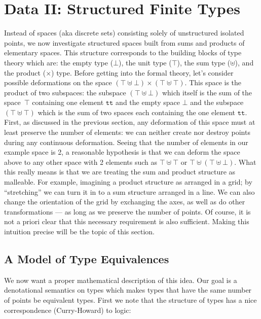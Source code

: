 \documentclass{article}
\begin{document}
\section{Data II: Structured Finite Types}
\label{sec:pi1}

Instead of spaces (aka discrete sets) consisting solely of
unstructured isolated points, we now investigate structured spaces
built from sums and products of elementary spaces. This structure
corresponds to the building blocks of type theory which are: the empty
type ($\bot$), the unit type ($\top$), the sum type ($\uplus$), and
the product ($\times$) type. Before getting into the formal theory,
let's consider possible deformations on the space $(\top \uplus \bot)
\times (\top \uplus \top)$. This space is the product of two
subspaces: the subspace $(\top \uplus \bot)$ which itself is the sum
of the space~$\top$ containing one element $\texttt{tt}$ and the empty
space $\bot$ and the subspace $(\top \uplus \top)$ which is the sum of
two spaces each containing the one element $\texttt{tt}$. First, as
discussed in the previous section, any deformation of this space must
at least preserve the number of elements: we can neither create nor
destroy points during any continuous deformation. Seeing that the
number of elements in our example space is 2, a reasonable hypothesis
is that we can deform the space above to any other space with 2
elements such as $\top \uplus \top$ or $\top \uplus (\top \uplus
\bot)$. What this really means is that we are treating the sum and
product structure as malleable. For example, imagining a product
structure as arranged in a grid; by ``stretching'' we can turn it
in to a sum structure arranged in a line. We can also change the
orientation of the grid by exchanging the axes, as well as do other
transformations --- as long as we preserve the number of points.
Of course, it is not a priori clear that this necessary requirement
is also sufficient.  Making this intuition precise will be the topic of this
section.

\subsection{A Model of Type Equivalences} 

We now want a proper mathematical description of this idea. Our goal
is a denotational semantics on types which makes types that have the
same number of points be equivalent types.  First we note that the
structure of types has a nice correspondence (Curry-Howard) to logic:
\end{document}
